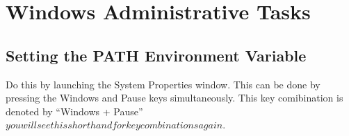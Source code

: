 
\chapter{Windows Administrative Tasks}
\section{Setting the PATH Environment Variable}
Do this by launching the System Properties window. This can be done by pressing the Windows and Pause keys simultaneously. This key comibination is
denoted by ``Windows + Pause'' \(you will see this shorthand for key combinations again\).
